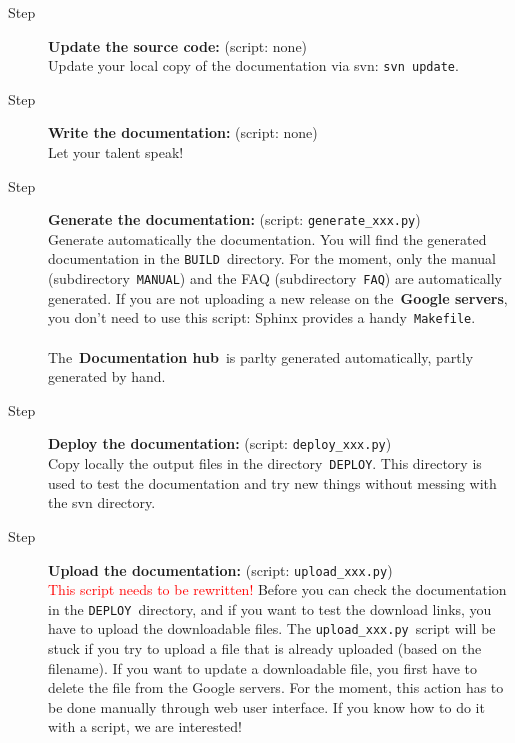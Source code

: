 \documentclass[a4paper,10pt]{article}
\newcommand{\code}[1]{\texttt{#1}}
\newcommand{\gservers}{{\bf Google servers}}
\newcommand{\dhub}{{\bf Documentation hub}}
\begin{document}
\begin{description}
 \item[Step \raisebox{.3pt}{\textcircled{\raisebox{-.9pt} {1}}}] {\bf Update the source code:} (script: none)\\Update your local copy of the documentation via svn: \code{svn update}.
 \item[Step \raisebox{.3pt}{\textcircled{\raisebox{-.9pt} {2}}}] {\bf Write the documentation:} (script: none)\\Let your talent speak!

 \item[Step \raisebox{.3pt}{\textcircled{\raisebox{-.9pt} {3}}}] {\bf Generate the documentation:} (script: \code{generate\_xxx.py})\\Generate automatically the documentation. You will find the generated documentation
in the \code{BUILD}~directory. For the moment, only the manual (subdirectory~\code{MANUAL}) and the FAQ (subdirectory~\code{FAQ}) are automatically generated. If you are not uploading a new release on the~\gservers, you 
don't need to use this script: Sphinx provides a handy~\code{Makefile}.\\~\\
The~\dhub\ is parlty generated automatically, partly generated by hand.

 \item[Step \raisebox{.3pt}{\textcircled{\raisebox{-.9pt} {4}}}] {\bf Deploy the documentation:} (script: \code{deploy\_xxx.py})\\Copy locally the output files in the directory~\code{DEPLOY}. This directory is used to test
the documentation and try new things without messing with the svn directory.

\item[Step \raisebox{.3pt}{\textcircled{\raisebox{-.9pt} {5}}}] {\bf Upload the documentation:} (script: \code{upload\_xxx.py})\\\textcolor{red}{This script needs to be rewritten!} Before you can check the documentation in the \code{DEPLOY}~directory, and if you want to test the download links, you have to upload the downloadable files. The \code{upload\_xxx.py}~script will be stuck if you try to upload a file that is already uploaded (based on the filename). If you want to update a downloadable file, you first have to delete the file from the Google servers. For the moment, this action has to be done manually through web user interface. If you know how to do it with a script, we are interested!


\end{description}
\end{document}
